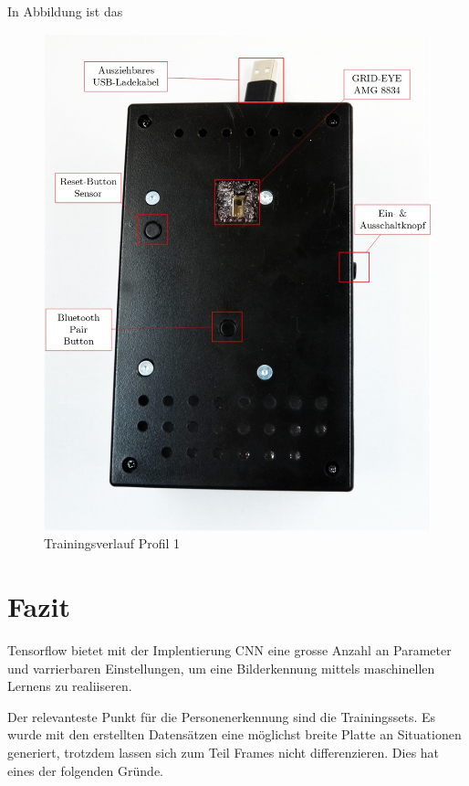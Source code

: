 In Abbildung ist das 


\begin{figure}[H]
	\centering
	\caption{Trainingsverlauf Profil 1}
	\label{fig:Echtzeitmesseinheit}
	\includegraphics[width=1.0\linewidth]{fig/Echtzeitmessgeraet.jpg}
\end{figure}




\section{Fazit}

Tensorflow bietet mit der Implentierung \ac{CNN} eine grosse Anzahl an Parameter und varrierbaren Einstellungen, um eine Bilderkennung mittels maschinellen Lernens zu realiiseren. 

Der relevanteste Punkt für die Personenerkennung sind die Trainingssets. Es wurde mit den erstellten Datensätzen eine möglichst breite Platte an Situationen generiert, trotzdem lassen sich zum Teil Frames nicht differenzieren. Dies hat eines der folgenden Gründe.

